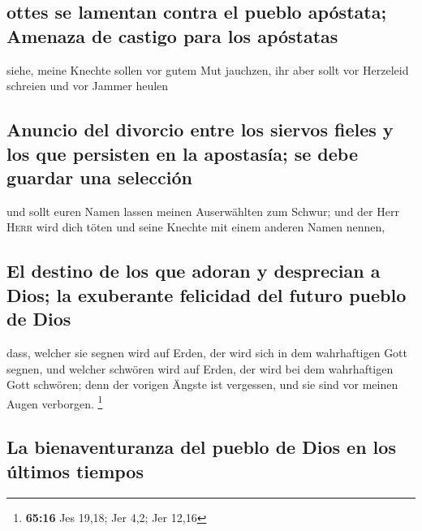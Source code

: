 \hypertarget{ottes-se-lamentan-contra-el-pueblo-apuxf3stata-amenaza-de-castigo-para-los-apuxf3statas}{%
\subsection{ottes se lamentan contra el pueblo apóstata; Amenaza de
castigo para los
apóstatas}\label{ottes-se-lamentan-contra-el-pueblo-apuxf3stata-amenaza-de-castigo-para-los-apuxf3statas}}

 siehe, meine Knechte sollen vor gutem Mut jauchzen, ihr
aber sollt vor Herzeleid schreien und vor Jammer heulen

\hypertarget{anuncio-del-divorcio-entre-los-siervos-fieles-y-los-que-persisten-en-la-apostasuxeda-se-debe-guardar-una-selecciuxf3n}{%
\subsection{Anuncio del divorcio entre los siervos fieles y los que
persisten en la apostasía; se debe guardar una
selección}\label{anuncio-del-divorcio-entre-los-siervos-fieles-y-los-que-persisten-en-la-apostasuxeda-se-debe-guardar-una-selecciuxf3n}}

 und sollt euren Namen lassen meinen Auserwählten zum
Schwur; und der Herr \textsc{Herr} wird dich töten und seine Knechte mit
einem anderen Namen nennen,

\hypertarget{el-destino-de-los-que-adoran-y-desprecian-a-dios-la-exuberante-felicidad-del-futuro-pueblo-de-dios}{%
\subsection{El destino de los que adoran y desprecian a Dios; la
exuberante felicidad del futuro pueblo de
Dios}\label{el-destino-de-los-que-adoran-y-desprecian-a-dios-la-exuberante-felicidad-del-futuro-pueblo-de-dios}}

 dass, welcher sie segnen wird auf Erden, der wird sich
in dem wahrhaftigen Gott segnen, und welcher schwören wird auf Erden,
der wird bei dem wahrhaftigen Gott schwören; denn der vorigen Ängste ist
vergessen, und sie sind vor meinen Augen verborgen. \footnote{\textbf{65:16}
  Jes 19,18; Jer 4,2; Jer 12,16}

\hypertarget{la-bienaventuranza-del-pueblo-de-dios-en-los-uxfaltimos-tiempos}{%
\subsection{La bienaventuranza del pueblo de Dios en los últimos
tiempos}\label{la-bienaventuranza-del-pueblo-de-dios-en-los-uxfaltimos-tiempos}}


